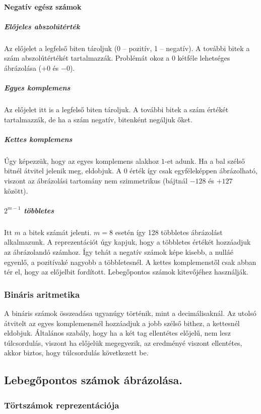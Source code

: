\documentclass[10pt]{article}
\begin{document}
\paragraph{Negatív egész számok}

\subparagraph{Előjeles abszolútérték} Az előjelet a legfelső biten tároljuk (0 -- pozitív, 1 -- negatív). A további bitek a szám abszolútértékét tartalmazzák. Problémát okoz a 0 kétféle lehetséges ábrázolása ($+0$ és $-0$).

\subparagraph{Egyes komplemens} Az előjelet itt is a legfelső biten tároljuk. A további bitek a szám értékét tartalmazzák, de ha a szám negatív, bitenként negáljuk őket.

\subparagraph{Kettes komplemens} Úgy képezzük, hogy az egyes komplemens alakhoz $1$-et adunk. Ha a bal szélső bitnél átvitel jelenik meg, eldobjuk. A $0$ érték így csak egyféleképpen ábrázolható, viszont az ábrázolási tartomány nem szimmetrikus (bájtnál $-128$ és $+127$ között).

\subparagraph{$2^{m-1}$ többletes} Itt $m$ a bitek számát jelenti. $m=8$ esetén így 128 többletes ábrázolást alkalmazunk. A reprezentációt úgy kapjuk, hogy a többletes értékét hozzáadjuk az ábrázolandó számhoz. Így tehát a negatív számok képe kisebb, a nulláé egyenlő, a pozitívaké nagyobb a többletesnél. A kettes komplemenstől csak abban tér el, hogy az előjelbit fordított. Lebegőpontos számok kitevőjéhez használják.

\subsubsection{Bináris aritmetika}

A bináris számok összeadása ugyanúgy történik, mint a decimálisaknál. Az utolsó átvitelt az egyes komplemensnél hozzáadjuk a jobb szélső bithez, a kettesnél eldobjuk. Általános szabály, hogy ha a két tag ellentétes előjelű, nem lesz túlcsordulás, viszont ha előjelük megegyezik, az eredményé viszont ellentétes, akkor biztos, hogy túlcsordulás következett be.

\subsection{Lebegőpontos számok ábrázolása.}

\subsubsection{Törtszámok reprezentációja}
\end{document}
